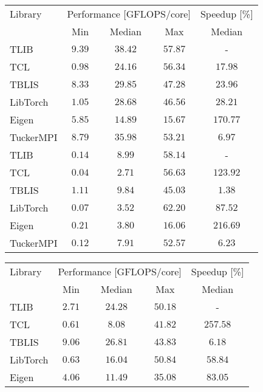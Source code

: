 \begin{table*}[h]
	\centering
	\footnotesize
	\begin{tabular}{lccc c}
		\toprule
		Library    & \multicolumn{3}{c}{Performance [GFLOPS/core]} & Speedup [\%] \\ 
		\cmidrule(lr){2-4} \cmidrule(lr){5-5}
		& Min   & Median  & Max & Median \\ 
		\midrule
		TLIB       & $\mathbf{9.39}$  & $\mathbf{38.42}$   & $\mathbf{57.87}$ &  - \\
		TCL        & $0.98$  & $24.16$   & $56.34$ & $17.98$     \\
		TBLIS      & $8.33$  & $29.85$   & $47.28$ & $23.96$     \\
		LibTorch   & $1.05$  & $28.68$   & $46.56$ & $28.21$     \\
		Eigen      & $5.85$  & $14.89$   & $15.67$ & $170.77$     \\
		TuckerMPI  & $8.79$  & $35.98$   & $53.21$ & $6.97$ \\
		\midrule
		TLIB       & $0.14$  & $8.99$    & $58.14$ &  - \\
		TCL        & $0.04$  & $2.71$    & $56.63$ & $123.92$     \\
		TBLIS      & $\mathbf{1.11}$  & $\mathbf{9.84}$  & $45.03$ & $1.38$     \\
		LibTorch   & $0.07$  & $3.52$    & $\mathbf{62.20}$ & $87.52$     \\
		Eigen      & $0.21$  & $3.80$    & $16.06$ & $216.69$     \\
		TuckerMPI  & $0.12$  & $7.91$    & $52.57$ & $6.23$ \\
		\bottomrule
	\end{tabular}
	\hspace{5em}
	\begin{tabular}{lccc c}
		\toprule
		Library    & \multicolumn{3}{c}{Performance [GFLOPS/core]} & Speedup [\%] \\ 
		\cmidrule(lr){2-4} \cmidrule(lr){5-5}
		& Min   & Median  & Max  & Median \\ 
		\midrule
		TLIB       & $2.71$  & $24.28$   & $\mathbf{50.18}$ &   -   \\
		TCL        & $0.61$  & $8.08$    & $41.82$ & $257.58$     \\
		TBLIS      & $\mathbf{9.06}$  & $\mathbf{26.81}$    & $43.83$ & $6.18$     \\
		LibTorch   & $0.63$  & $16.04$   & $50.84$ & $58.84$     \\
		Eigen      & $4.06$  & $11.49$   & $35.08$ & $83.05$     \\

\end{tabular}
\end{table*}
